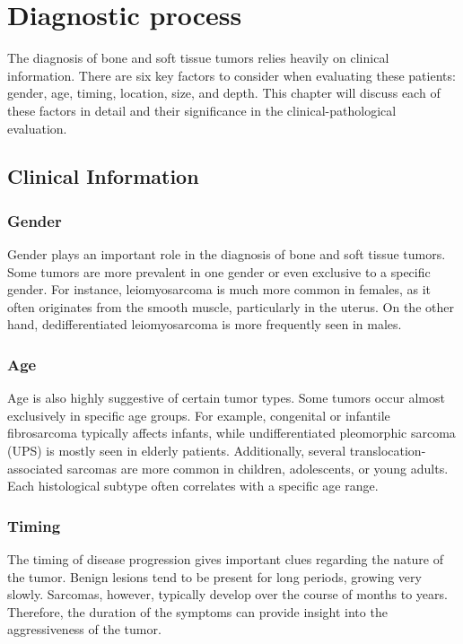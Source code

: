 
\chapter{Diagnostic process}

The diagnosis of bone and soft tissue tumors relies heavily on clinical information. There are six key factors to consider when evaluating these patients: gender, age, timing, location, size, and depth. This chapter will discuss each of these factors in detail and their significance in the clinical-pathological evaluation.

\section{Clinical Information}
\subsection{Gender}
Gender plays an important role in the diagnosis of bone and soft tissue tumors. Some tumors are more prevalent in one gender or even exclusive to a specific gender. For instance, leiomyosarcoma is much more common in females, as it often originates from the smooth muscle, particularly in the uterus. On the other hand, dedifferentiated leiomyosarcoma is more frequently seen in males.

\subsection{Age}
Age is also highly suggestive of certain tumor types. Some tumors occur almost exclusively in specific age groups. For example, congenital or infantile fibrosarcoma typically affects infants, while undifferentiated pleomorphic sarcoma (UPS) is mostly seen in elderly patients. Additionally, several translocation-associated sarcomas are more common in children, adolescents, or young adults. Each histological subtype often correlates with a specific age range.

\subsection{Timing}
The timing of disease progression gives important clues regarding the nature of the tumor. Benign lesions tend to be present for long periods, growing very slowly. Sarcomas, however, typically develop over the course of months to years. Therefore, the duration of the symptoms can provide insight into the aggressiveness of the tumor.

